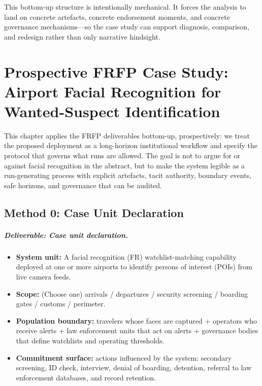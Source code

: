 This bottom-up structure is intentionally mechanical. It forces the analysis to land on concrete artefacts,
concrete endorsement moments, and concrete governance mechanisms—so the case study can support diagnosis,
comparison, and redesign rather than only narrative hindsight.

\chapter{Prospective FRFP Case Study: Airport Facial Recognition for Wanted-Suspect Identification}
\label{ch:frfp-prospective-airport-fr}

This chapter applies the FRFP deliverables bottom-up, prospectively: we treat the proposed deployment
as a long-horizon institutional workflow and specify the protocol that governs what runs are allowed.
The goal is not to argue for or against facial recognition in the abstract, but to make the system
legible as a run-generating process with explicit artefacts, tacit authority, boundary events,
safe horizons, and governance that can be audited.

\section{Method 0: Case Unit Declaration}
\label{sec:airport-m0}

\paragraph{Deliverable: Case unit declaration.}
\begin{itemize}
  \item \textbf{System unit:} A facial recognition (FR) watchlist-matching capability deployed at one or more airports
        to identify persons of interest (POIs) from live camera feeds.
  \item \textbf{Scope:} (Choose one) arrivals / departures / security screening / boarding gates / customs / perimeter.
  \item \textbf{Population boundary:} travelers whose faces are captured + operators who receive alerts + law enforcement
        units that act on alerts + governance bodies that define watchlists and operating thresholds.
  \item \textbf{Commitment surface:} actions influenced by the system: secondary screening, ID check, interview, denial
        of boarding, detention, referral to law enforcement databases, and record retention.
\end{itemize}

